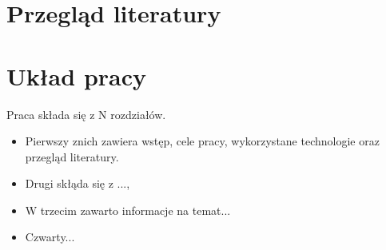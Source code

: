 \section{Przegląd literatury}
\label{sec:przegladLiteratury}	
	
\section{Układ pracy}
\label{sec:ukladPracy}

Praca składa się z N rozdziałów. 

\begin{itemize}
\item Pierwszy znich zawiera wstęp, cele pracy, wykorzystane technologie oraz przegląd literatury. 
\item Drugi skłąda się z ..., 
\item W trzecim zawarto informacje na temat...
\item Czwarty...
\end{itemize}

